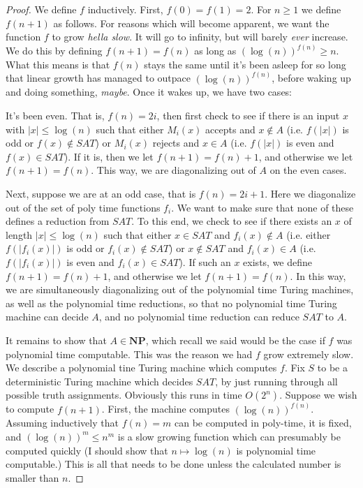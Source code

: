 \begin{proof}
	\par We define $f$ inductively. First, $f(0) = f(1) = 2$. For $n \geq 1$ we define $f(n+1)$ as follows. For reasons which will become apparent, we want the function $f$ to grow \textit{hella slow}. It will go to infinity, but will barely \textit{ever} increase. We do this by defining $f(n+1) = f(n)$ as long as $(\log(n))^{f(n)} \geq n$. What this means is that $f(n)$ stays the same until it's been asleep for so long that linear growth has managed to outpace $(\log(n))^{f(n)}$, before waking up and doing something, \textit{maybe}. Once it wakes up, we have two cases:
	\par It's been even. That is, $f(n) = 2i$, then first check to see if there is an input $x$ with $|x| \leq \log(n)$ such that either $M_i(x)$ accepts and $x \notin A$ (i.e. $f(|x|)$ is odd or $f(x) \notin SAT$) or $M_i(x)$ rejects and $x \in A$ (i.e. $f(|x|)$ is even and $f(x) \in SAT$). If it is, then we let $f(n+1) = f(n)+1$, and otherwise we let $f(n+1) = f(n)$. This way, we are diagonalizing out of $A$ on the even cases.
	\par Next, suppose we are at an odd case, that is $f(n) = 2i+1$. Here we diagonalize out of the set of poly time functions $f_i$. We want to make sure that none of these defines a reduction from $SAT$. To this end, we check to see if there exists an $x$ of length $|x| \leq \log(n)$ such that either $x \in SAT$ and $f_i(x) \notin A$ (i.e. either $f(|f_i(x)|)$ is odd or $f_i(x) \notin SAT$) or $x \notin SAT$ and $f_i(x) \in A$ (i.e. $f(|f_i(x)|)$ is even and $f_i(x) \in SAT$). If such an $x$ exists, we define $f(n+1) = f(n)+1$, and otherwise we let $f(n+1) = f(n)$. In this way, we are simultaneously diagonalizing out of the polynomial time Turing machines, as well as the polynomial time reductions, so that no polynomial time Turing machine can decide $A$, and no polynomial time reduction can reduce $SAT$ to $A$. 
	\par It remains to show that $A \in \textbf{NP}$, which recall we said would be the case if $f$ was polynomial time computable. This was the reason we had $f$ grow extremely slow. We describe a polynomial tine Turing machine which computes $f$. Fix $S$ to be a deterministic Turing machine which decides $SAT$, by just running through all possible truth assignments. Obviously this runs in time $O(2^n)$. Suppose we wish to compute $f(n+1)$. First, the machine computes $(\log(n))^{f(n)}$. Assuming inductively that $f(n)=m$ can be computed in poly-time, it is fixed, and $(\log(n))^{m} \leq n^m$ is a slow growing function which can presumably be computed quickly (I should show that $n \mapsto \log(n)$ is polynomial time computable.) This is all that needs to be done unless the calculated number is smaller than $n$. 

\end{proof}
